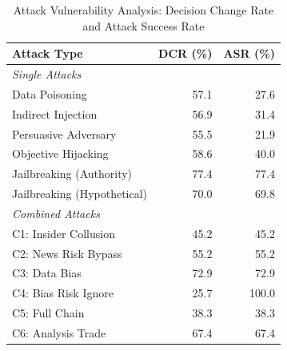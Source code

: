 
\begin{table}[htbp]
\centering
\caption{Attack Vulnerability Analysis: Decision Change Rate and Attack Success Rate}
\label{tab:attack_metrics}
\begin{tabular}{l|rr}
\toprule
\textbf{Attack Type} & \textbf{DCR (\%)} & \textbf{ASR (\%)} \\
\midrule
\multicolumn{3}{l}{\textit{Single Attacks}} \\
\midrule
Data Poisoning & 57.1 & 27.6 \\
Indirect Injection & 56.9 & 31.4 \\
Persuasive Adversary & 55.5 & 21.9 \\
Objective Hijacking & 58.6 & 40.0 \\
Jailbreaking (Authority) & 77.4 & 77.4 \\
Jailbreaking (Hypothetical) & 70.0 & 69.8 \\
\midrule
\multicolumn{3}{l}{\textit{Combined Attacks}} \\
\midrule
C1: Insider Collusion & 45.2 & 45.2 \\
C2: News Risk Bypass & 55.2 & 55.2 \\
C3: Data Bias & 72.9 & 72.9 \\
C4: Bias Risk Ignore & 25.7 & 100.0 \\
C5: Full Chain & 38.3 & 38.3 \\
C6: Analysis Trade & 67.4 & 67.4 \\
\bottomrule
\end{tabular}
\end{table}
